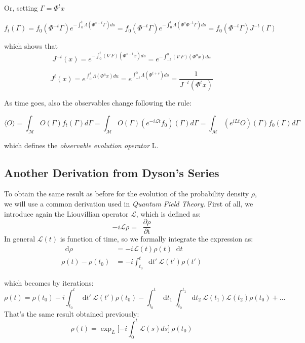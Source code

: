 \documentclass{article}
\newcommand*\diff{\mathop{}\!\mathrm{d}}
\newcommand*\tder[1]{\mathop{}\!\frac{\partial #1}{\partial \mathrm{t}} }
\begin{document}
Or, setting $\Gamma = \Phi^t x$ %

$$ f_t(\Gamma) =  f_0(\Phi^{-t} \Gamma ) e^{ - \int_{0}^{t} \Lambda(\Phi^{s-t} \Gamma) ds } =  f_0(\Phi^{-t} \Gamma ) e^{ - \int_{0}^{t} \Lambda(\Phi^s \Phi^{-t} \Gamma) ds } = f_0(\Phi^{-t} \Gamma) J^{-t}(\Gamma)$$

which shows that
\begin{equation}
J^{-t}(x) = e^{- \int_{0}^{t} (\nabla F)(\Phi^{s-t} x) ds} = e^{- \int_{-t}^{0} (\nabla F)(\Phi^{u} x) du} 
\end{equation}

\begin{equation}
J^t(x)= e^{\int_{0}^{t} \Lambda(\Phi^ux) du}= e^{\int_{-t}^{0} \Lambda(\Phi^{t+s}) ds}= \frac{1}{J^{-t}(\Phi^t x)}  
\end{equation}

As time goes, also the observables change following the rule:

\begin{equation}
\langle O \rangle = \int_{\mathcal{M}} O(\Gamma) f_t(\Gamma) d \Gamma = \int_{\mathcal{M}} O(\Gamma) (e^{-i\mathcal{L}t} f_0) (\Gamma) d \Gamma = \int_{\mathcal{M}} (e^{iLt} O)(\Gamma) f_0(\Gamma) d \Gamma
\end{equation}

which defines the \emph{observable evolution operator} L.

\subsection{Another Derivation from Dyson's Series}
To obtain the same result as before for the evolution of the probability density $\rho$, we will use a common derivation used in \textit{Quantum Field Theory}. First of all, we introduce again the Liouvillian operator $\mathcal{L}$, which is defined as:
$$-i \mathcal{L} \rho = \tder{\rho}$$
In general $\mathcal{L}(t)$ is function of time, so we formally integrate the expression as:
\begin{align*}
\diff\rho &= -i \mathcal{L}(t) \rho(t) \diff t\\
 \rho(t) -\rho(t_0) &= -i\int_{t_0}^t \diff{t'} \: \mathcal{L}(t') \rho(t') 
\end{align*}

which becomes by iterations:
$$\rho(t) = \rho(t_0) -i\int_{t_0}^t \diff{t'} \: \mathcal{L}(t') \rho(t_0) - \int_{t_0}^t \diff{t_1} \: \int_{t_0}^{t_1} \diff{t_2} \: \mathcal{L}(t_1) \mathcal{L}(t_2) \rho (t_0) +... $$
That's the same result obtained previously:
$$\rho (t) =  \exp_L \Big [{ -i \int_{0}^{t} \mathcal{L} (s) ds} \Big ] \: \rho (t_0)$$
\end{document}
